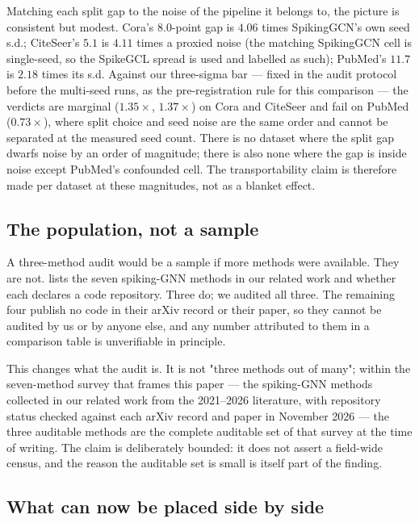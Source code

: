 Matching each split gap to the noise of the pipeline it belongs to, the picture is consistent but
modest. Cora's $8.0$-point gap is $4.06$ times SpikingGCN's own seed s.d.; CiteSeer's $5.1$ is
$4.11$ times a proxied noise (the matching SpikingGCN cell is single-seed, so the SpikeGCL spread
is used and labelled as such); PubMed's $11.7$ is $2.18$ times its s.d. Against our three-sigma
bar --- fixed in the audit protocol before the multi-seed runs, as the pre-registration rule for
this comparison --- the verdicts are marginal ($1.35\times$, $1.37\times$) on Cora and CiteSeer and
fail on PubMed ($0.73\times$), where split choice and seed noise are the same order and cannot be
separated at the measured seed count. There is no dataset where the split gap dwarfs noise by an
order of magnitude; there is also none where the gap is inside noise except PubMed's confounded
cell. The transportability claim is therefore made per dataset at these magnitudes, not as a
blanket effect.

\subsection{The population, not a sample}
\label{sec:census}



A three-method audit would be a sample if more methods were available. They are not.
 lists the seven spiking-GNN methods in our related work and whether each declares
a code repository. Three do; we audited all three. The remaining four publish no code in their arXiv
record or their paper, so they cannot be audited by us or by anyone else, and any number attributed
to them in a comparison table is unverifiable in principle.

This changes what the audit is. It is not "three methods out of many"; within the seven-method
survey that frames this paper --- the spiking-GNN methods collected in our related work from the
2021--2026 literature, with repository status checked against each arXiv record and paper in
November 2026 --- the three auditable methods are the complete auditable set of that survey at the
time of writing. The claim is deliberately bounded: it does not assert a field-wide census, and the
reason the auditable set is small is itself part of the finding.

\subsection{What can now be placed side by side}

